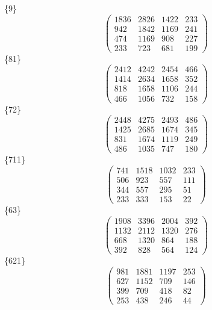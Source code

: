 \documentclass[12pt,reqno]{amsart}
\begin{document}
\Large
\{9\}                             $$ \begin{pmatrix} 
                     1836 & 2826 & 1422 & 233 \\[6pt]
                      942 & 1842 & 1169 & 241 \\[6pt]
                      474 & 1169 & 908 & 227 \\[6pt]
                         233 & 723 & 681 & 199
                              \end{pmatrix} $$ 
\{81\}                             $$ \begin{pmatrix} 
                     2412 & 4242 & 2454 & 466 \\[6pt]
                     1414 & 2634 & 1658 & 352 \\[6pt]
                      818 & 1658 & 1106 & 244 \\[6pt]
                        466 & 1056 & 732 & 158
                              \end{pmatrix} $$ 
\{72\}                             $$ \begin{pmatrix} 
                     2448 & 4275 & 2493 & 486 \\[6pt]
                     1425 & 2685 & 1674 & 345 \\[6pt]
                      831 & 1674 & 1119 & 249 \\[6pt]
                        486 & 1035 & 747 & 180
                              \end{pmatrix} $$ 
\{711\}                             $$ \begin{pmatrix} 
                      741 & 1518 & 1032 & 233 \\[6pt]
                       506 & 923 & 557 & 111 \\[6pt]
                       344 & 557 & 295 & 51 \\[6pt]
                         233 & 333 & 153 & 22
                              \end{pmatrix} $$ 
\{63\}                             $$ \begin{pmatrix} 
                     1908 & 3396 & 2004 & 392 \\[6pt]
                     1132 & 2112 & 1320 & 276 \\[6pt]
                      668 & 1320 & 864 & 188 \\[6pt]
                         392 & 828 & 564 & 124
                              \end{pmatrix} $$ 
\{621\}                             $$ \begin{pmatrix} 
                      981 & 1881 & 1197 & 253 \\[6pt]
                      627 & 1152 & 709 & 146 \\[6pt]
                       399 & 709 & 418 & 82 \\[6pt]
                         253 & 438 & 246 & 44
                              \end{pmatrix} $$ 
\end{document}
